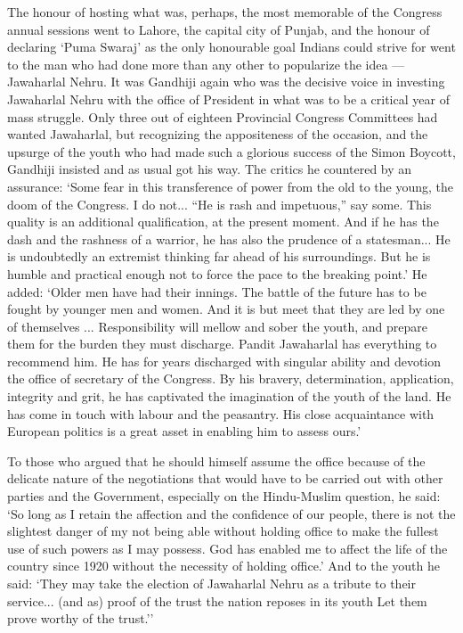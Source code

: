 The honour of hosting what was, perhaps, the most memorable of the Congress annual sessions went to Lahore, the capital city of Punjab, and the honour of declaring `Puma Swaraj' as the only honourable goal Indians could strive for went to the man who had done more than any other to popularize the idea — Jawaharlal Nehru. It was Gandhiji again who was the decisive voice in investing Jawaharlal Nehru with the office of President in what was to be a critical year of mass struggle. Only three out of eighteen Provincial Congress Committees had wanted Jawaharlal, but recognizing the appositeness of the occasion, and the upsurge of the youth who had made such a glorious success of the Simon Boycott, Gandhiji insisted and as usual got his way. The critics he countered by an assurance: `Some fear in this transference of power from the old to the young, the doom of the Congress. I do not... ``He is rash and impetuous,'' say some. This quality is an additional qualification, at the present moment. And if he has the dash and the rashness of a warrior, he has also the prudence of a statesman... He is undoubtedly an extremist thinking far ahead of his surroundings. But he is humble and practical enough not to force the pace to the breaking point.' He added: `Older men have had their innings. The battle of the future has to be fought by younger men and women. And it is but meet that they are led by one of themselves ... Responsibility will mellow and sober the youth, and prepare them for the burden they must discharge. Pandit Jawaharlal has everything to recommend him. He has for years discharged with singular ability and devotion the office of secretary of the Congress. By his bravery, determination, application, integrity and grit, he has captivated the imagination of the youth of the land. He has come in touch with labour and the peasantry. His close acquaintance with European politics is a great asset in enabling him to assess ours.' 

To those who argued that he should himself assume the office because of the delicate nature of the negotiations that would have to be carried out with other parties and the Government, especially on the Hindu-Muslim question, he said: `So long as I retain the affection and the confidence of our people, there is not the slightest danger of my not being able without holding office to make the fullest use of such powers as I may possess. God has enabled me to affect the life of the country since 1920 without the necessity of holding office.' And to the youth he said: `They may take the election of Jawaharlal Nehru as a tribute to their service... (and as) proof of the trust the nation reposes in its youth Let them prove worthy of the trust.'' 

